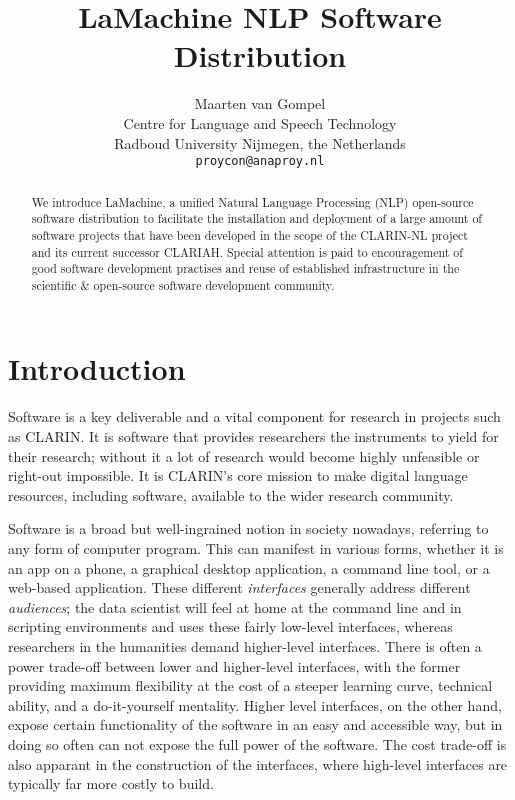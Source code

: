 \documentclass[a4paper,11pt]{article}
\title{LaMachine NLP Software Distribution}
\author{Maarten van Gompel \\
  Centre for Language and Speech Technology \\
  Radboud University Nijmegen, the Netherlands \\
  {\tt proycon@anaproy.nl} \\ %
}
\date{}
\begin{document}
\maketitle

\begin{abstract}
We introduce LaMachine, a unified Natural Language Processing (NLP) open-source software distribution to facilitate the
installation and deployment of a large amount of software projects that have been developed in the scope of the
CLARIN-NL project and its current successor CLARIAH. Special attention is paid to encouragement of good software
development practises and reuse of established infrastructure in the scientific \& open-source software development
community.
\end{abstract}

\section{Introduction} \label{intro}

Software is a key deliverable and a vital component for research in projects such as CLARIN. It is software that
provides researchers the instruments to yield for their research; without it a lot of research would become highly
unfeasible or right-out impossible. It is CLARIN's core mission to make digital language resources, including software,
available to the wider research community.

Software is a broad but well-ingrained notion in society nowadays, referring to any form of computer program. This can
manifest in various forms, whether it is an app on a phone, a graphical desktop application, a command line tool, or a
web-based application. These different \emph{interfaces} generally address different \emph{audiences}; the data
scientist will feel at home at the command line and in scripting environments and uses these fairly low-level
interfaces, whereas researchers in the humanities demand higher-level interfaces. There is often a power trade-off
between lower and higher-level interfaces, with the former providing maximum flexibility at the cost of a steeper
learning curve, technical ability, and a do-it-yourself mentality. Higher level interfaces, on the other
hand, expose certain functionality of the software in an easy and accessible way, but in doing so often can not expose
the full power of the software. The cost trade-off is also apparant in the construction of the interfaces, where
high-level interfaces are typically far more costly to build.
\end{document}

